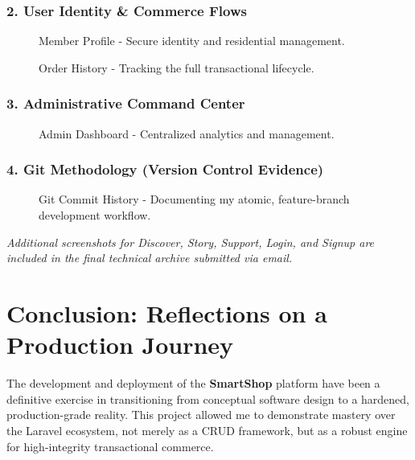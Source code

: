 \documentclass[12pt,a4paper]{article}
\begin{document}
\subsection{2. User Identity \& Commerce Flows}
\begin{figure}[H]
    \centering
    \caption{Member Profile - Secure identity and residential management.}
\end{figure}

\begin{figure}[H]
    \centering
    \caption{Persistent Cart - Real-time total calculation and item management.}
    \centering
    \caption{Order History - Tracking the full transactional lifecycle.}
\end{figure}

\subsection{3. Administrative Command Center}
\begin{figure}[H]
    \centering
    \caption{Admin Dashboard - Centralized analytics and management.}
\end{figure}

\subsection{4. Git Methodology (Version Control Evidence)}
\begin{figure}[H]
    \centering
    \caption{Git Commit History - Documenting my atomic, feature-branch development workflow.}
\end{figure}

\vfill
\begin{center}
    \textit{Additional screenshots for Discover, Story, Support, Login, and Signup are included in the final technical archive submitted via email.}
\end{center}

\chapter{Conclusion: Reflections on a Production Journey}

The development and deployment of the \textbf{SmartShop} platform have been a definitive exercise in transitioning from conceptual software design to a hardened, production-grade reality. This project allowed me to demonstrate mastery over the Laravel ecosystem, not merely as a CRUD framework, but as a robust engine for high-integrity transactional commerce.
\end{document}
